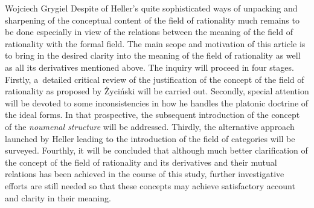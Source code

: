 \begin{artengenv}{Wojciech Grygiel}
Despite of Heller's quite sophisticated ways of unpacking and sharpening of the conceptual content of the field of rationality much remains to be done especially in view of the relations between the meaning of the field of rationality with the formal field. The main scope and motivation of this article is to bring in the desired clarity into the meaning of the field of rationality as well as all its derivatives mentioned above. The inquiry will proceed in four stages. Firstly, a~detailed critical review of the justification of the concept of the field of rationality as proposed by Życiński will be carried out. Secondly, special attention will be devoted to some inconsistencies in how he handles the platonic doctrine of the ideal forms. In that prospective, the subsequent introduction of the concept of the \textit{noumenal structure} will be addressed. Thirdly, the alternative approach launched by Heller leading to the introduction of the field of categories will be surveyed. Fourthly, it will be concluded that although much better clarification of the concept of the field of rationality and its derivatives and their mutual relations has been achieved in the course of this study, further investigative efforts are still needed so that these concepts may achieve satisfactory account and clarity in their meaning.


\end{artengenv}

